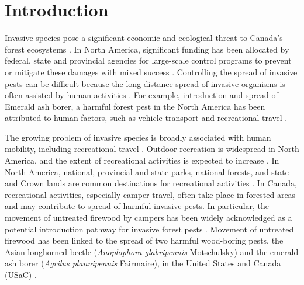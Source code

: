 
\section{Introduction}
Invasive species pose a significant economic and ecological threat to Canada’s forest ecosystems \cite{wilson2009something,jacobi2011firewood}. In North America, significant funding has been allocated by federal, state and provincial agencies for large-scale control programs to prevent or mitigate these damages with mixed success \cite{tobin2008cost,nisc2007}. Controlling the spread of invasive pests can be difficult because the long-distance spread of invasive organisms is often assisted by human activities \cite{kolar2001progress,wilson2009something}. For example, introduction and spread of Emerald ash borer, a harmful forest pest in the North America \cite{kovacs2010cost,kovacs2014bioeconomic,poland2006emerald} has been attributed to human factors, such as vehicle transport \cite{buck2009hitchhiking} and recreational travel \cite{koch2014using}.  

The growing problem of invasive species is broadly associated with human mobility, including recreational travel \cite{kolar2001progress,wilson2009something,liebhold2008population,prasad2010modeling}. Outdoor recreation is widespread in North America, and the extent of recreational activities is expected to increase \cite{cordell2008nature,cordell2008latest,cordell2012outdoor}. In North America, national, provincial and state parks, national forests, and state and Crown lands are common destinations for recreational activities \cite{eagles2002trends,siikamaki2011contributions}. In Canada, recreational activities, especially camper travel, often take place in forested areas and may contribute to spread of harmful invasive pests. In particular, the movement of untreated firewood by campers has been widely acknowledged as a potential introduction pathway for invasive forest pests \cite{barlow2014modelling,tobin2010does,peterson2012motivation,koch2014using,jacobi2011firewood}. Movement of untreated firewood has been linked to the spread of two harmful wood-boring pests, the Asian longhorned beetle (\textit{Anoplophora glabripennis} Motschulsky) and the emerald ash borer (\textit{Agrilus plannipennis} Fairmaire), in the United States and Canada (USaC) \cite{haack1997new,petrice2006effects}. 

